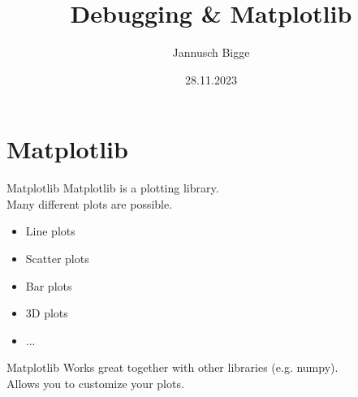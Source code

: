 \documentclass{beamer}
\title{Debugging \& Matplotlib}
\author{Jannusch Bigge}
\date{28.11.2023}
\begin{document}
\begin{frame}
    \titlepage
\end{frame}

\section{Matplotlib}

\begin{frame}{Matplotlib}
    Matplotlib is a plotting library.\\\pause
    Many different plots are possible.\\\pause
    \begin{itemize}
        \item Line plots
        \item Scatter plots
        \item Bar plots
        \item 3D plots
        \item ...
    \end{itemize}

\end{frame}

\begin{frame}{Matplotlib}
    Works great together with other libraries (e.g. numpy).\\\pause
    Allows you to customize your plots.\\

\end{frame}
\end{document}
